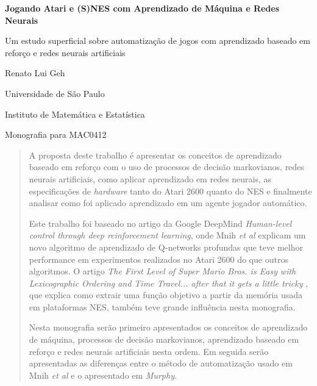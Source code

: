 \documentclass[a4paper,10pt]{article}
\theoremstyle{plain}
\begin{document}
\begin{titlepage}
  \begin{center}
    \LARGE
    \textbf{Jogando Atari e (S)NES com Aprendizado de Máquina e Redes Neurais}

    \vspace{1.7cm}
    \Large
    Um estudo superficial sobre automatização de jogos com aprendizado baseado em reforço e
    redes neurais artificiais

    \vspace{1.7cm}
    \Large
    Renato Lui Geh

    \vfill
    \Large
    Universidade de São Paulo

    Instituto de Matemática e Estatística

    Monografia para MAC0412
    \vspace{1.5cm}
  \end{center}
\end{titlepage}

\newpage
\null\vspace{\fill}
\begin{abstract}
  \large
  A proposta deste trabalho é apresentar os conceitos de aprendizado baseado em reforço com o uso
  de processos de decisão markovianos, redes neurais artificiais, como aplicar aprendizado em redes
  neurais, as especificações de \textit{hardware} tanto do Atari 2600 quanto do NES e finalmente
  analisar como foi aplicado aprendizado em um agente jogador automático.

  Este trabalho foi baseado no artigo da Google DeepMind \textit{Human-level control through deep
  reinforcement learning}\cite{mnih-et-al}, onde Mnih \textit{et al} explicam um novo algoritmo de
  aprendizado de Q-networks profundas que teve melhor performance em experimentos realizados no
  Atari 2600 do que outros algoritmos. O artigo \textit{The First Level of Super Mario Bros. is
  Easy with Lexicographic Ordering and Time Travel... \small{after that it gets a little tricky}}
  \cite{dr-murphy}, que explica como extrair uma função objetivo a partir da memória usada em
  plataformas NES, também teve grande influência nesta monografia.

  Nesta monografia serão primeiro apresentados os conceitos de aprendizado de máquina, processos
  de decisão markovianos, aprendizado baseado em reforço e redes neurais artificiais nesta ordem.
  Em seguida serão apresentadas as diferenças entre o método de automatização usado em Mnih
  \textit{et al} e o apresentado em \textit{Murphy}.
\end{abstract}
\vspace{\fill}
\newpage
\large
\tableofcontents
\normalsize
\newpage
\end{document}
